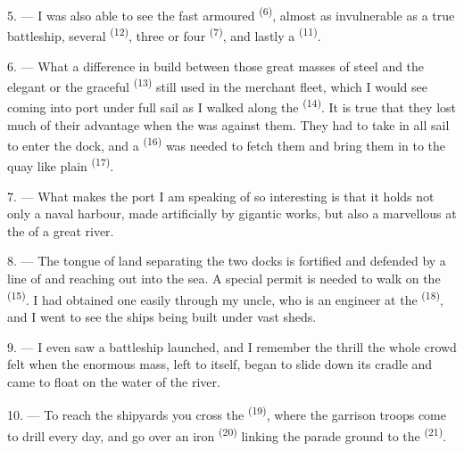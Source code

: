 5. --- I was also able to see the fast armoured 
\textsuperscript{(6)}, almost as invulnerable as a true battleship, several
 \textsuperscript{(12)}, three or four 
\textsuperscript{(7)}, and lastly a  \textsuperscript{(11)}.

6. --- What a difference in build between those great masses of steel and
the elegant  or the graceful 
\textsuperscript{(13)} still used in the merchant fleet, which I would see coming
into port under full sail as I walked along the  \textsuperscript{(14)}.
It is true that they lost much of their advantage when the  was
against them. They had to take in all sail to enter the dock, and a
 \textsuperscript{(16)} was needed to fetch them and bring them in to the
quay like plain  \textsuperscript{(17)}.

\VUsaut{3.0mm}
\VUsaut{3.0mm}

7. --- What makes the port I am speaking of so interesting is that it
holds not only a naval harbour, made artificially by gigantic works, but
also a marvellous  at the  of a great
river.

8. --- The tongue of land separating the two docks is fortified and
defended by a line of  and  reaching out
into the sea. A special permit is needed to walk on the
 \textsuperscript{(15)}. I had obtained one easily through my
uncle, who is an engineer at the  \textsuperscript{(18)}, and I went
to see the ships being built under vast sheds.

9. --- I even saw a battleship launched, and I remember the thrill the
whole crowd felt when the enormous mass, left to itself, began to slide
down its cradle and came to float on the water of the river.

10. --- To reach the shipyards you cross the 
\textsuperscript{(19)}, where the garrison troops come to drill every day, and go
over an iron  \textsuperscript{(20)} linking the parade ground to
the  \textsuperscript{(21)}.

\VUsaut{3.0mm}
\VUsaut{3.0mm}

